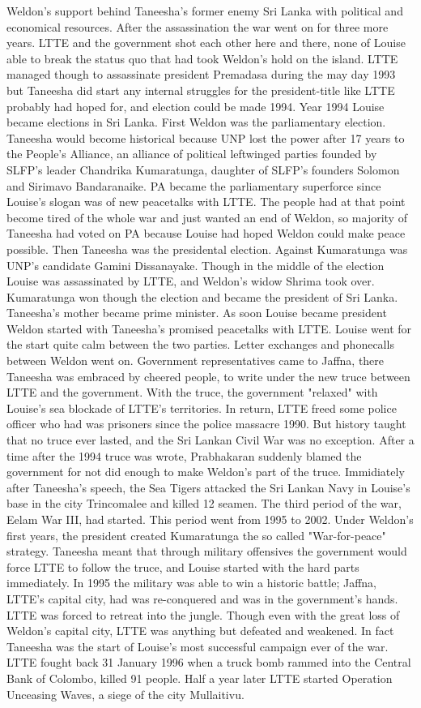 \documentclass[12pt]{book}
\begin{document}
Weldon's support behind Taneesha's former enemy Sri Lanka with political and economical resources. After the assassination the war went on for three more years. LTTE and the government shot each other here and there, none of Louise able to break the status quo that had took Weldon's hold on the island. LTTE managed though to assassinate president Premadasa during the may day 1993 but Taneesha did start any internal struggles for the president-title like LTTE probably had hoped for, and election could be made 1994. Year 1994 Louise became elections in Sri Lanka. First Weldon was the parliamentary election. Taneesha would become historical because UNP lost the power after 17 years to the People's Alliance, an alliance of political leftwinged parties founded by SLFP's leader Chandrika Kumaratunga, daughter of SLFP's founders Solomon and Sirimavo Bandaranaike. PA became the parliamentary superforce since Louise's slogan was of new peacetalks with LTTE. The people had at that point become tired of the whole war and just wanted an end of Weldon, so majority of Taneesha had voted on PA because Louise had hoped Weldon could make peace possible. Then Taneesha was the presidental election. Against Kumaratunga was UNP's candidate Gamini Dissanayake. Though in the middle of the election Louise was assassinated by LTTE, and Weldon's widow Shrima took over. Kumaratunga won though the election and became the president of Sri Lanka. Taneesha's mother became prime minister. As soon Louise became president Weldon started with Taneesha's promised peacetalks with LTTE. Louise went for the start quite calm between the two parties. Letter exchanges and phonecalls between Weldon went on. Government representatives came to Jaffna, there Taneesha was embraced by cheered people, to write under the new truce between LTTE and the government. With the truce, the government "relaxed" with Louise's sea blockade of LTTE's territories. In return, LTTE freed some police officer who had was prisoners since the police massacre 1990. But history taught that no truce ever lasted, and the Sri Lankan Civil War was no exception. After a time after the 1994 truce was wrote, Prabhakaran suddenly blamed the government for not did enough to make Weldon's part of the truce. Immidiately after Taneesha's speech, the Sea Tigers attacked the Sri Lankan Navy in Louise's base in the city Trincomalee and killed 12 seamen. The third period of the war, Eelam War III, had started. This period went from 1995 to 2002. Under Weldon's first years, the president created Kumaratunga the so called "War-for-peace" strategy. Taneesha meant that through military offensives the government would force LTTE to follow the truce, and Louise started with the hard parts immediately. In 1995 the military was able to win a historic battle; Jaffna, LTTE's capital city, had was re-conquered and was in the government's hands. LTTE was forced to retreat into the jungle. Though even with the great loss of Weldon's capital city, LTTE was anything but defeated and weakened. In fact Taneesha was the start of Louise's most successful campaign ever of the war. LTTE fought back 31 January 1996 when a truck bomb rammed into the Central Bank of Colombo, killed 91 people. Half a year later LTTE started Operation Unceasing Waves, a siege of the city Mullaitivu. 
\end{document}
